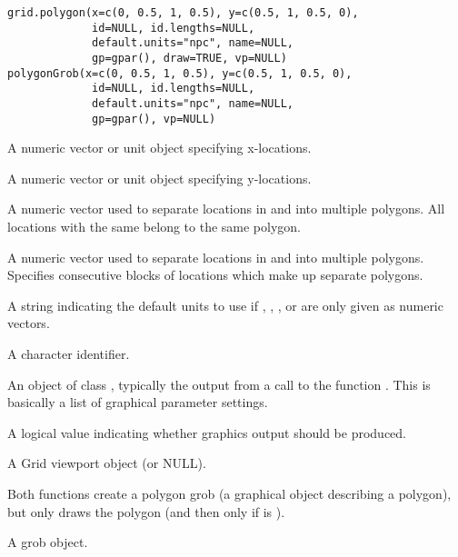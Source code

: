 %
\begin{Usage}
\begin{verbatim}
grid.polygon(x=c(0, 0.5, 1, 0.5), y=c(0.5, 1, 0.5, 0),
             id=NULL, id.lengths=NULL,
             default.units="npc", name=NULL,
             gp=gpar(), draw=TRUE, vp=NULL)
polygonGrob(x=c(0, 0.5, 1, 0.5), y=c(0.5, 1, 0.5, 0),
             id=NULL, id.lengths=NULL,
             default.units="npc", name=NULL,
             gp=gpar(), vp=NULL)
\end{verbatim}
\end{Usage}
%
\begin{Arguments}
\begin{ldescription}
\item[\code{x}] A numeric vector or unit object specifying x-locations.
\item[\code{y}] A numeric vector or unit object specifying y-locations.
\item[\code{id}] A numeric vector used to separate locations in  and
 into multiple polygons.  All locations with the same
 belong to the same polygon.
\item[\code{id.lengths}] A numeric vector used to separate locations in  and
 into multiple polygons.  Specifies consecutive blocks of
locations which make up separate polygons.
\item[\code{default.units}] A string indicating the default units to use
if , , , or 
are only given as numeric vectors. 
\item[\code{name}]  A character identifier. 
\item[\code{gp}] An object of class , typically the output
from a call to the function .  This is basically
a list of graphical parameter settings.
\item[\code{draw}] A logical value indicating whether graphics output
should be produced.
\item[\code{vp}] A Grid viewport object (or NULL).
\end{ldescription}
\end{Arguments}
%
\begin{Details}\relax
Both functions create a polygon grob (a graphical object describing a
polygon), but only 
draws the polygon (and then only if  is ).  
\end{Details}
%
\begin{Value}
A grob object.
\end{Value}
